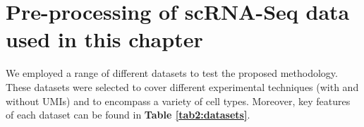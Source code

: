 
\section{Pre-processing of scRNA-Seq data used in this chapter} \label{sec2:datasets}

We employed a range of different datasets to test the proposed methodology. 
These datasets were selected to cover different experimental techniques (with and without UMIs) and to encompass a variety of cell types. 
Moreover, key features of each dataset can be found in \textbf{Table \ref{tab2:datasets}}. 

